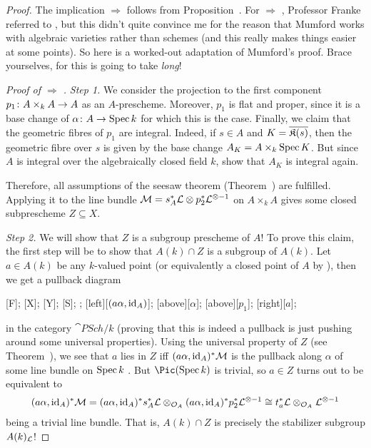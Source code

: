 \documentclass[a4paper,parskip=half,numbers=enddot, DIV=12]{scrreprt}
\begin{document}
\begin{proof}
	The implication  $\Rightarrow$  follows from Proposition~. For  $\Rightarrow$ , Professor Franke referred to \cite[\S6 Application~1]{mumford1974abelian}, but this didn't quite convince me for the reason that Mumford works with algebraic varieties rather than schemes (and this really makes things easier at some points). So here is a worked-out adaptation of Mumford's proof. Brace yourselves, for this is going to take \emph{long}!
	
	\emph{Proof of  $\Rightarrow$ .}
	\emph{Step 1.} We consider the projection to the first component $p_1\colon A\times_kA\morphism A$ as an $A$-prescheme. Moreover, $p_1$ is flat and proper, since it is a base change of $\alpha\colon A\morphism\Spec k$ for which this is the case. Finally, we claim that the geometric fibres of $p_1$ are integral. Indeed, if $s\in A$ and $K=\overline{\mathfrak{K}(s)}$, then the geometric fibre over $s$ is given by the base change $A_K=A\times_k\operatorname{Spec} K$. But since $A$ is integral over the algebraically closed field $k$, \cite[ and ]{stacks-project} show that $A_K$ is integral again.
	
	Therefore, all assumptions of the seesaw theorem (Theorem~) are fulfilled. Applying it to the line bundle $\mathcal{M}=s_A^*\mathcal{L}\otimes p_2^*\mathcal{L}^{\otimes-1}$ on $A\times_kA$ gives some closed subprescheme $Z\subseteq X$.
	
	\emph{Step 2.} We will show that $Z$ is a subgroup prescheme of $A$! To prove this claim, the first step will be to show that $A(k)\cap Z$ is a subgroup of $A(k)$. Let $a\in A(k)$ be any $k$-valued point (or equivalently a closed point of $A$ by ), then we get a pullback diagram
	\begin{diagram*}
		[F];
		[X];
		[Y];
		[S];
		;
		\scriptsize
		[$(a\alpha,\operatorname{id}_A)$];
		[above][$\alpha$];
		[above][$p_1$];
		[right][$a$];
	\end{diagram*}
	in the category $\cat{PSch}/k$ (proving that this is indeed a pullback is just pushing around some universal properties). Using the universal property of $Z$ (see Theorem~), we see that $a$ lies in $Z$ iff $(a\alpha,\operatorname{id}_A)^*\mathcal{M}$ is the pullback along $\alpha$ of some line bundle on $\operatorname{Spec} k$ . But $\Pic(\Spec k)$ is trivial, so $a\in Z$ turns out to be equivalent to
	\begin{align*}
		(a\alpha,\operatorname{id}_A)^*\mathcal{M}=(a\alpha,\operatorname{id}_A)^*s_A^*\mathcal{L}\otimes_{\mathcal{O}_A}(a\alpha,\operatorname{id}_A)^*p_2^*\mathcal{L}^{\otimes-1}\cong t_a^*\mathcal{L}\otimes_{\mathcal{O}_A}\mathcal{L}^{\otimes -1}
	\end{align*}
	 being a trivial line bundle. That is, $A(k)\cap Z$ is precisely the stabilizer subgroup $A(k)_{\mathcal{L}}$!
	 

\end{proof}
\end{document}
